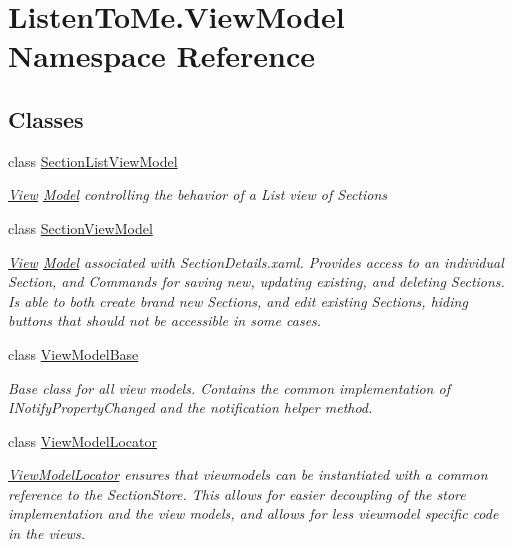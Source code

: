 \hypertarget{namespace_listen_to_me_1_1_view_model}{}\section{Listen\+To\+Me.\+View\+Model Namespace Reference}
\label{namespace_listen_to_me_1_1_view_model}
\subsection*{Classes}
\begin{DoxyCompactItemize}
\item 
class \hyperlink{class_listen_to_me_1_1_view_model_1_1_section_list_view_model}{Section\+List\+View\+Model}
\begin{DoxyCompactList}\small\item\em \hyperlink{namespace_listen_to_me_1_1_view}{View} \hyperlink{namespace_listen_to_me_1_1_model}{Model} controlling the behavior of a List view of Sections \end{DoxyCompactList}\item 
class \hyperlink{class_listen_to_me_1_1_view_model_1_1_section_view_model}{Section\+View\+Model}
\begin{DoxyCompactList}\small\item\em \hyperlink{namespace_listen_to_me_1_1_view}{View} \hyperlink{namespace_listen_to_me_1_1_model}{Model} associated with Section\+Details.\+xaml. Provides access to an individual Section, and Commands for saving new, updating existing, and deleting Sections. Is able to both create brand new Sections, and edit existing Sections, hiding buttons that should not be accessible in some cases. \end{DoxyCompactList}\item 
class \hyperlink{class_listen_to_me_1_1_view_model_1_1_view_model_base}{View\+Model\+Base}
\begin{DoxyCompactList}\small\item\em Base class for all view models. Contains the common implementation of I\+Notify\+Property\+Changed and the notification helper method. \end{DoxyCompactList}\item 
class \hyperlink{class_listen_to_me_1_1_view_model_1_1_view_model_locator}{View\+Model\+Locator}
\begin{DoxyCompactList}\small\item\em \hyperlink{class_listen_to_me_1_1_view_model_1_1_view_model_locator}{View\+Model\+Locator} ensures that viewmodels can be instantiated with a common reference to the Section\+Store. This allows for easier decoupling of the store implementation and the view models, and allows for less viewmodel specific code in the views. \end{DoxyCompactList}\end{DoxyCompactItemize}
